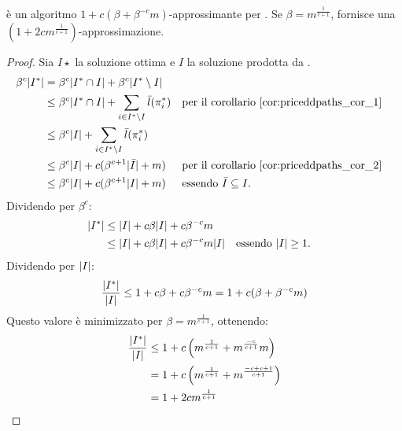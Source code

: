 \begin{theorem}\label{thm:priceddpaths_approx}
	\PricedDisjointPaths è un algoritmo $1+c(\beta+\beta^{-c}m)$-approssimante per \DisjointPaths.
	Se $\beta=m^{\frac{1}{c+1}}$, \PricedDisjointPaths fornisce una $(1+2cm^{\frac{1}{c+1}})$-approssimazione.
\end{theorem}
\begin{proof}
	Sia $I\star$ la soluzione ottima e $I$ la soluzione prodotta da \PricedDisjointPaths.
	\begin{align*}
		\beta^c| I^* | & = \beta^c| I^*\cap I |+\beta^c| I^*\setminus I |                                                                                  \\
		                     & \leq \beta^c| I^*\cap I | + \sum_{i\in I^*\setminus I} \bar l(\pi^*_i) &  & \text{per il corollario \ref{cor:priceddpaths_cor_1}} \\
		                     & \leq \beta^c| I | + \sum_{i\in I^*\setminus I} \bar l(\pi^*_i)                                                                        \\
		                     & \leq \beta^c| I | + c(\beta^{c+1}| \bar I |+m)                                &  & \text{per il corollario \ref{cor:priceddpaths_cor_2}} \\
		                     & \leq \beta^c| I | + c(\beta^{c+1}| I |+m)                                      &  & \text{essendo $\bar I\subseteq I$} \text.
	\end{align*}
	Dividendo per $\beta^c$:
	\begin{align*}
		| I^* | & \leq | I |+c\beta| I |+c\beta^{-c}m                                                   \\
		              & \leq | I |+c\beta| I |+c\beta^{-c}m| I | &  & \text{essendo $| I |\geq 1$} \text.
	\end{align*}
	Dividendo per $| I |$:
	\begin{equation*}
		\frac{| I^* |}{| I |} \leq 1+c\beta+c\beta^{-c}m = 1+c(\beta+\beta^{-c}m)
	\end{equation*}
	Questo valore è minimizzato per $\beta=m^{\frac{1}{c+1}}$, ottenendo:
	\begin{align*}
		\frac{| I^* |}{| I |} & \leq 1+c\left(m^{\frac{1}{c+1}}+m^{\frac{-c}{c+1}}m\right) \\
		                           & = 1+c\left(m^{\frac{1}{c+1}}+m^{\frac{-c+c+1}{c+1}}\right) \\
		                           & = 1+2cm^{\frac{1}{c+1}}
	\end{align*}
\end{proof}

